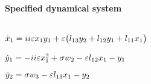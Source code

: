 \(\)
\paragraph{Specified dynamical system}
\(
\)\par
\(\dot x_{1}=ii \varepsilon x_{1} y_{1}+\varepsilon \big(l_{13} y_{2}+l_{12} y_{1}+l_{11
} x_{1}\big)
\)\par
\(\dot y_{1}=-ii \varepsilon x_{1}^{2}+\sigma  w_{2}-\varepsilon l_{12} x_{1}-y_{1}
\)\par
\(\dot y_{2}=\sigma  w_{3}-\varepsilon l_{13} x_{1}-y_{2}
\)\par
